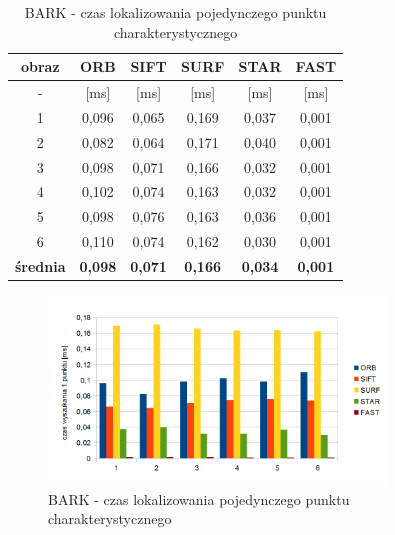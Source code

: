 \begin{table}[htbp]
  \centering
  \caption{BARK - czas lokalizowania pojedynczego punktu charakterystycznego}
    \begin{tabular}{|c|c|c|c|c|c|}
    \hline
    obraz & \textbf{ORB} & \textbf{SIFT} & \textbf{SURF} & \textbf{STAR} & \textbf{FAST} \\
    \hline
    -  & [ms] & [ms] & [ms] & [ms] & [ms] \\\hline
    1 & 0,096 & 0,065 & 0,169 & 0,037 & 0,001 \\
    2 & 0,082 & 0,064 & 0,171 & 0,040 & 0,001 \\
    3 & 0,098 & 0,071 & 0,166 & 0,032 & 0,001 \\
    4 & 0,102 & 0,074 & 0,163 & 0,032 & 0,001 \\
    5 & 0,098 & 0,076 & 0,163 & 0,036 & 0,001 \\
    6 & 0,110 & 0,074 & 0,162 & 0,030 & 0,001 \\\hline
    \textbf{średnia} & \textbf{0,098} & \textbf{0,071} & \textbf{0,166} & \textbf{0,034} & \textbf{0,001} \\\hline
    \end{tabular}%
  \label{tab:bark_f2}%
\end{table}%


\begin{figure}
\centering
\includegraphics[width=0.8\textwidth]{pict/mikolajczyk/bark/f2.png}
\caption{BARK - czas lokalizowania pojedynczego punktu charakterystycznego}
\label{fig:bark_f2}
\end{figure}

